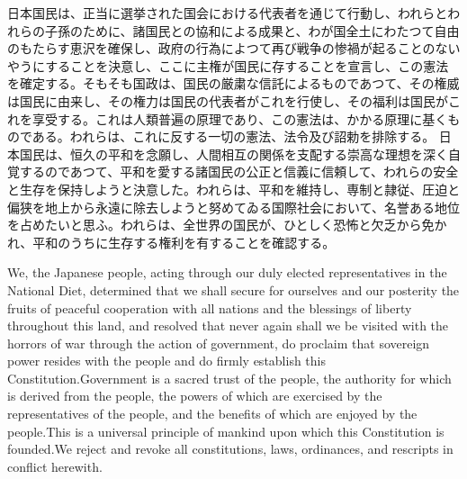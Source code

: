 
日本国民は、正当に選挙された国会における代表者を通じて行動し、われらとわれらの子孫のために、諸国民との協和による成果と、わが国全土にわたつて自由のもたらす恵沢を確保し、政府の行為によつて再び戦争の惨禍が起ることのないやうにすることを決意し、ここに主権が国民に存することを宣言し、この憲法を確定する。そもそも国政は、国民の厳粛な信託によるものであつて、その権威は国民に由来し、その権力は国民の代表者がこれを行使し、その福利は国民がこれを享受する。これは人類普遍の原理であり、この憲法は、かかる原理に基くものである。われらは、これに反する一切の憲法、法令及び詔勅を排除する。
日本国民は、恒久の平和を念願し、人間相互の関係を支配する崇高な理想を深く自覚するのであつて、平和を愛する諸国民の公正と信義に信頼して、われらの安全と生存を保持しようと決意した。われらは、平和を維持し、専制と隷従、圧迫と偏狭を地上から永遠に除去しようと努めてゐる国際社会において、名誉ある地位を占めたいと思ふ。われらは、全世界の国民が、ひとしく恐怖と欠乏から免かれ、平和のうちに生存する権利を有することを確認する。


We, the Japanese people, acting through our duly elected representatives in the National Diet, determined that we shall secure for ourselves and our posterity the fruits of peaceful cooperation with all nations and the blessings of liberty throughout this land, and resolved that never again shall we be visited with the horrors of war through the action of government, do proclaim that sovereign power resides with the people and do firmly establish this Constitution.Government is a sacred trust of the people, the authority for which is derived from the people, the powers of which are exercised by the representatives of the people, and the benefits of which are enjoyed by the people.This is a universal principle of mankind upon which this Constitution is founded.We reject and revoke all constitutions, laws, ordinances, and rescripts in conflict herewith.
